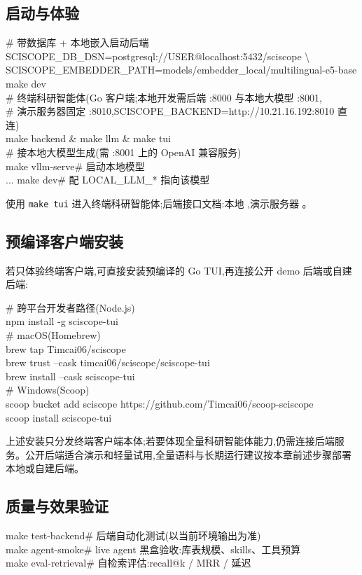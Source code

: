 \subsection{启动与体验}
\begin{codepanel}\ttfamily\small
\# 带数据库 + 本地嵌入启动后端\\
SCISCOPE\_DB\_DSN=postgresql://USER@localhost:5432/sciscope \textbackslash\\
SCISCOPE\_EMBEDDER\_PATH=models/embedder\_local/multilingual-e5-base make dev\\[3pt]
\# 终端科研智能体(Go 客户端;本地开发需后端 :8000 与本地大模型 :8001,\\
\# 演示服务器固定 :8010,SCISCOPE\_BACKEND=http://10.21.16.192:8010 直连)\\
make backend \&  make llm \&  make tui\\[3pt]
\# 接本地大模型生成(需 :8001 上的 OpenAI 兼容服务)\\
make vllm-serve\hfill\# 启动本地模型\\
... make dev\hfill\# 配 LOCAL\_LLM\_* 指向该模型
\end{codepanel}
使用 \texttt{make tui} 进入终端科研智能体;后端接口文档:本地 ,演示服务器 。

\subsection{预编译客户端安装}
若只体验终端客户端,可直接安装预编译的 Go TUI,再连接公开 demo 后端或自建后端:
\begin{codepanel}\ttfamily\small
\# 跨平台开发者路径(Node.js)\\
npm install -g sciscope-tui\\[3pt]
\# macOS(Homebrew)\\
brew tap Timcai06/sciscope\\
brew trust --cask timcai06/sciscope/sciscope-tui\\
brew install --cask sciscope-tui\\[3pt]
\# Windows(Scoop)\\
scoop bucket add sciscope https://github.com/Timcai06/scoop-sciscope\\
scoop install sciscope-tui
\end{codepanel}
上述安装只分发终端客户端本体;若要体现全量科研智能体能力,仍需连接后端服务。公开后端适合演示和轻量试用,全量语料与长期运行建议按本章前述步骤部署本地或自建后端。

\subsection{质量与效果验证}
\begin{codepanel}\ttfamily\small
make test-backend\hfill\# 后端自动化测试(以当前环境输出为准)\\
make agent-smoke\hfill\# live agent 黑盒验收:库表规模、skills、工具预算\\
make eval-retrieval\hfill\# 自检索评估:recall@k / MRR / 延迟
\end{codepanel}

